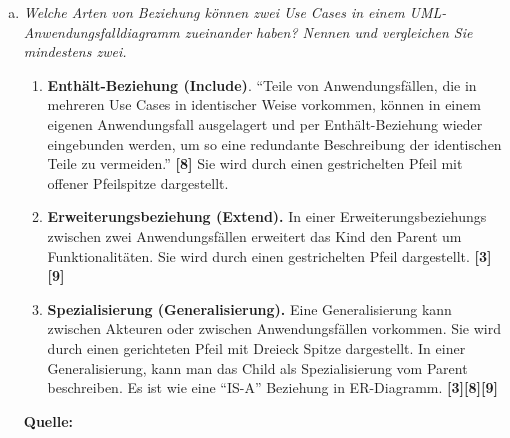 \begin{enumerate}[a)]
    \item {\itshape Welche Arten von Beziehung können zwei Use Cases in einem UML-Anwendungsfalldiagramm zueinander haben? Nennen und vergleichen Sie mindestens zwei.}
    \begin{enumerate}[1.]
        \item \textbf{Enthält-Beziehung (Include)}. ``Teile von Anwendungsfällen, die in mehreren Use Cases in identischer Weise vorkommen, können in einem eigenen Anwendungsfall ausgelagert und per Enthält-Beziehung wieder eingebunden werden, um so eine redundante Beschreibung der identischen Teile zu vermeiden.'' \textbf{[8]} Sie wird durch einen gestrichelten Pfeil mit offener Pfeilspitze dargestellt.
        \item \textbf{Erweiterungsbeziehung (Extend).} In einer Erweiterungsbeziehungs zwischen zwei Anwendungsfällen erweitert das Kind den Parent um Funktionalitäten. Sie wird durch einen gestrichelten Pfeil dargestellt. \textbf{[3][9]}
        \item  \textbf{Spezialisierung (Generalisierung).} Eine Generalisierung kann zwischen Akteuren oder zwischen Anwendungsfällen vorkommen. Sie wird durch einen gerichteten Pfeil mit Dreieck Spitze dargestellt. In einer Generalisierung, kann man das Child als Spezialisierung vom Parent beschreiben. Es ist wie eine ``IS-A'' Beziehung in ER-Diagramm. \textbf{[3][8][9]}
    \end{enumerate}
    
    
    \textbf{Quelle:}
\end{enumerate}
